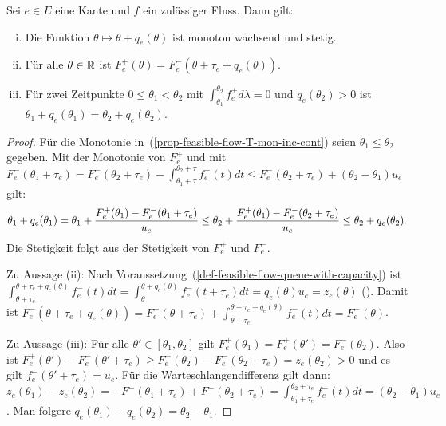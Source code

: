 \begin{proposition}\label{prop-feasible-flow}
	Sei $e\in E$ eine Kante und $f$ ein zulässiger Fluss. Dann gilt:
	\begin{enumerate}[(i)]
		\item\label{prop-feasible-flow-T-mon-inc-cont} Die Funktion $\theta \mapsto \theta + q_e(\theta)$ ist monoton wachsend und stetig.
		\item\label{prop-feasible-flow-det-outflow} Für alle $\theta\in\mathbb{R}$ ist $F_e^+(\theta) = F_e^-(\theta+\tau_e+q_e(\theta))$.
		\item\label{prop-feasible-flow-queue-delay} Für zwei Zeitpunkte $0\leq \theta_1 < \theta_2$ mit $\int_{\theta_1}^{\theta_2} f^+_e d\lambda = 0$ und $q_e(\theta_2)>0$ ist $\theta_1 + q_e(\theta_1) = \theta_2 + q_e(\theta_2)$.
	\end{enumerate}
\end{proposition}
\begin{proof}
	Für die Monotonie in~(\ref{prop-feasible-flow-T-mon-inc-cont}) seien $\theta_1 \leq \theta_2$ gegeben.
	Mit der Monotonie von $F_e^+$ und mit $F_e^-(\theta_1 + \tau_e) = F_e^-(\theta_2+\tau_e) - \int_{\theta_1+\tau}^{\theta_2+\tau} f_e^-(t)dt\leq F_e^-(\theta_2 + \tau_e) + (\theta_2 - \theta_1)u_e$ gilt: 
	$$
		\theta_1 + q_e(\theta_1)
		= \theta_1 + \frac{F_e^+(\theta_1) - F_e^-(\theta_1 + \tau_e)}{u_e}\\
		\leq \theta_2 + \frac{F_e^+(\theta_1) - F_e^-(\theta_2+\tau_e)}{u_e} \leq \theta_2 + q_e(\theta_2).
	$$
	Die Stetigkeit folgt aus der Stetigkeit von $F_e^+$ und $F_e^-$.
	
	Zu Aussage (ii): Nach Voraussetzung~(\ref{def-feasible-flow-queue-with-capacity}) ist $\int_{\theta + \tau_e}^{\theta + \tau_e + q_e(\theta)} f_e^-(t) dt = \int_{\theta}^{\theta + q_e(\theta)}f_e^-(t + \tau_e) dt = q_e(\theta)  u_e = z_e(\theta)$ (). Damit ist $F_e^-(\theta + \tau_e + q_e(\theta)) = F_e^-(\theta+\tau_e) + \int_{\theta+\tau_e}^{\theta+\tau_e+q_e(\theta)}f_e^-(t)dt = F_e^+(\theta)$.
	
	Zu Aussage (iii): Für alle $\theta'\in [\theta_1, \theta_2]$ gilt $F_e^+(\theta_1) = F_e^+(\theta') = F_e^-(\theta_2)$.
	Also ist $F_e^+(\theta') - F_e^-(\theta' + \tau_e) \geq F_e^+(\theta_2)-F_e^-(\theta_2 + \tau_e) = z_e(\theta_2) > 0$ und es gilt $f_e^-(\theta' + \tau_e)=u_e$.
	Für die Warteschlangendifferenz gilt dann: 
	$z_e(\theta_1)-z_e(\theta_2)=-F^-(\theta_1 + \tau_e) + F^-(\theta_2 + \tau_e) = \int_{\theta_1 + \tau_e}^{\theta_2 + \tau_e} f^-_e(t) dt = (\theta_2 - \theta_1)u_e$.
	Man folgere $q_e(\theta_1) - q_e(\theta_2) = \theta_2 - \theta_1$.
\end{proof}

